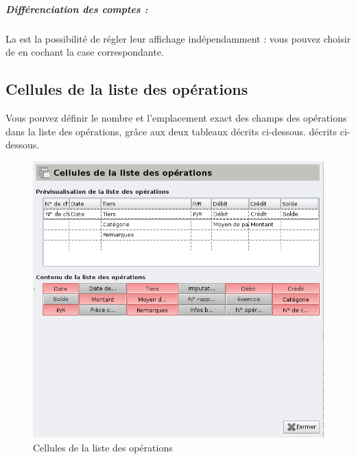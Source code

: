 \subparagraph{Différenciation des comptes :\label{setup-operations-list-differenciation}}

La 
 est la possibilité de régler leur affichage indépendamment : vous pouvez choisir de  en cochant la case correspondante.





\subsection{Cellules de la liste des opérations\label{setup-operations-cells}}

Vous pouvez définir le nombre et l'emplacement exact des champs des opérations dans la liste des opérations, grâce aux deux tableaux 
\ifIllustration décrits ci-dessous.
\else décrits ci-dessous.
\fi

\ifIllustration
\begin{figure}[ht]
\begin{center}
\includegraphics[scale=0.5]{image/screenshot/setup_listCells}
\end{center}
\caption{Cellules de la liste des opérations}
\label{setup-listCells-img}
\end{figure}
\fi

